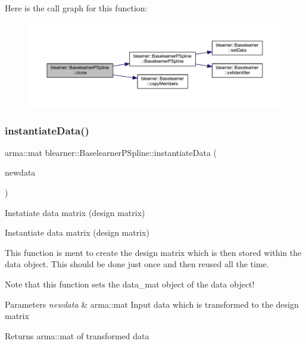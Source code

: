 Here is the call graph for this function\+:\nopagebreak
\begin{figure}[H]
\begin{center}
\leavevmode
\includegraphics[width=350pt]{classblearner_1_1_baselearner_p_spline_aea7d3c0ef6d77ffb8a2fb2000fae6399_cgraph}
\end{center}
\end{figure}
\mbox{\label{classblearner_1_1_baselearner_p_spline_a1a83493d31e14f7e28d0aba40a3f4396}} 
\subsubsection{\texorpdfstring{instantiate\+Data()}{instantiateData()}}
{\footnotesize\ttfamily arma\+::mat blearner\+::\+Baselearner\+P\+Spline\+::instantiate\+Data (\begin{DoxyParamCaption}\item[{const arma\+::mat \&}]{newdata }\end{DoxyParamCaption})\hspace{0.3cm}{\ttfamily [virtual]}}



Instatiate data matrix (design matrix) 

Instantiate data matrix (design matrix)

This function is ment to create the design matrix which is then stored within the data object. This should be done just once and then reused all the time.

Note that this function sets the {\ttfamily data\+\_\+mat} object of the data object!


\begin{DoxyParams}{Parameters}
{\em newdata} & {\ttfamily arma\+::mat} Input data which is transformed to the design matrix\\
\hline
\end{DoxyParams}
\begin{DoxyReturn}{Returns}
{\ttfamily arma\+::mat} of transformed data 
\end{DoxyReturn}


